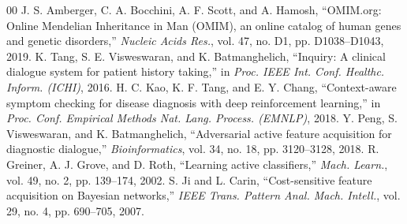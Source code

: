 \documentclass[conference]{IEEEtran}
\begin{document}
\begin{thebibliography}{00}
 J. S. Amberger, C. A. Bocchini, A. F. Scott, and A. Hamosh, ``OMIM.org: Online Mendelian Inheritance in Man (OMIM), an online catalog of human genes and genetic disorders,'' \textit{Nucleic Acids Res.}, vol. 47, no. D1, pp. D1038--D1043, 2019.
 K. Tang, S. E. Visweswaran, and K. Batmanghelich, ``Inquiry: A clinical dialogue system for patient history taking,'' in \textit{Proc. IEEE Int. Conf. Healthc. Inform. (ICHI)}, 2016.
 H. C. Kao, K. F. Tang, and E. Y. Chang, ``Context-aware symptom checking for disease diagnosis with deep reinforcement learning,'' in \textit{Proc. Conf. Empirical Methods Nat. Lang. Process. (EMNLP)}, 2018.
 Y. Peng, S. Visweswaran, and K. Batmanghelich, ``Adversarial active feature acquisition for diagnostic dialogue,'' \textit{Bioinformatics}, vol. 34, no. 18, pp. 3120--3128, 2018.
 R. Greiner, A. J. Grove, and D. Roth, ``Learning active classifiers,'' \textit{Mach. Learn.}, vol. 49, no. 2, pp. 139--174, 2002.
 S. Ji and L. Carin, ``Cost-sensitive feature acquisition on Bayesian networks,'' \textit{IEEE Trans. Pattern Anal. Mach. Intell.}, vol. 29, no. 4, pp. 690--705, 2007.
\end{thebibliography}
\end{document}
